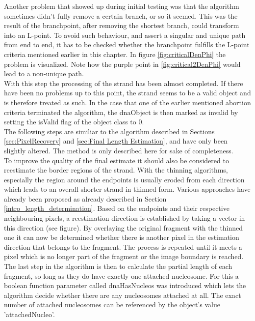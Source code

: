 \documentclass{article}
\begin{document}
Another problem that showed up during initial testing was that the algorithm sometimes didn't fully remove a certain branch, or so it seemed. This was the result of the branchpoint, after removing the shortest branch, could transform into an L-point. To avoid such behaviour, and assert a singular and unique path from end to end, it has to be checked whether the branchpoint fulfills the L-point criteria mentioned earlier in this chapter. In figure \ref{fig:criticalDenPhi} the problem is visualized. Note how the purple point in \ref{fig:critical2DenPhi} would lead to a non-unique path.\\
With this step the processing of the strand has been almost completed. If there have been no problems up to this point, the strand seems to be a valid object and is therefore treated as such. In the case that one of the earlier mentioned abortion criteria terminated the algorithm, the dnaObject is then marked as invalid by setting the isValid flag of the object class to 0. \\
The following steps are similiar to the algorithm described in Sections \ref{sec:PixelRecovery} and \ref{sec:Final Length Estimation}, and have only been slightly altered. The method is only described here for sake of completeness. 
\\
To improve the quality of the final estimate it should also be considered to reestimate the border regions of the strand. With the thinning algorithms, especially the region around the endpoints is usually eroded from each direction which leads to an overall shorter strand in thinned form. Various approaches have already been proposed as already described in Section \ref{intro_length_determination}. Based on the endpoints and their respective neighbouring pixels, a reestimation direction is established by taking a vector in this direction (see figure). By overlaying the original fragment with the thinned one it can now be determined whether there is another pixel in the estimation direction that belongs to the fragment. The process is repeated until it meets a pixel which is no longer part of the fragment or the image boundary is reached. \\
The last step in the algorithm is then to calculate the partial length of each fragment, so long as they do have exactly one attached nucleosome. For this a boolean function parameter called dnaHasNucleos was introduced which lets the algorithm decide whether there are any nucleosomes attached at all. The exact number of attached nucleosomes can be referenced by the object's value 'attachedNucleo'. \\
\end{document}
